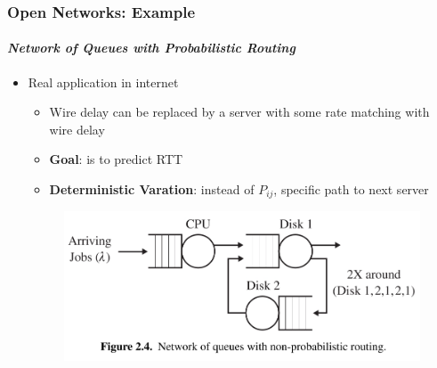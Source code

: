 \documentclass{beamer}
\begin{document}
\begin{frame}
    \frametitle{Open Networks: Example}
    \framesubtitle{\textbf{\textit{Network of Queues with Probabilistic Routing}}}
	\begin{itemize}
			
		\item Real application in internet
			\begin{itemize}
			\item Wire delay can be  replaced by a server with some rate matching with wire delay
			\item \textbf{Goal}: is to predict RTT
			\item \textbf{Deterministic Varation}: instead of $P_{ij}$, specific path to next 						server
			\end{itemize}
			\begin{figure}
        		\begin{center}
		            \includegraphics[scale=0.3]{images/deterministicopenqueue.jpg}
        		\end{center}
		    \end{figure}
		  
	\end{itemize}	    
    
\end{frame}
\end{document}
